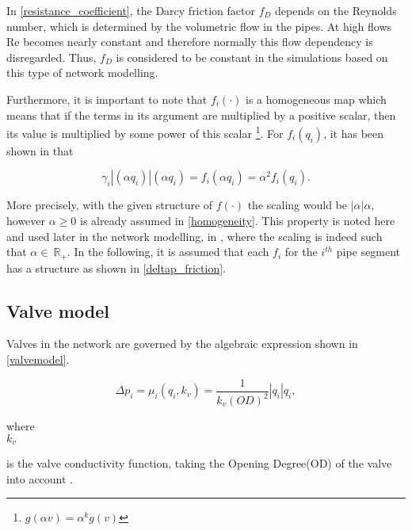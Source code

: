 In \eqref{resistance_coefficient}, the Darcy friction factor $f_D$ depends on the Reynolds number, which is determined by the volumetric flow in the pipes. At high flows Re becomes nearly constant and therefore normally this flow dependency is disregarded. Thus, $f_D$ is considered to be constant in the simulations based on this type of network modelling. 

Furthermore, it is important to note that $f_i(\cdot)$ is a homogeneous map which means that if the terms in its argument are multiplied by a positive scalar, then its value is multiplied by some power of this scalar \footnote{$g(\alpha v) = \alpha^k g(v)$}. For $f_i(q_i)$, it has been shown in \cite{oneinput_paper} that

\begin{equation}
  \label{homogeneity}
  \gamma_i |(\alpha q_i)|(\alpha q_i) = f_i(\alpha q_i) = \alpha^2 f_i(q_i).
\end{equation}

More precisely, with the given structure of $f(\cdot)$ the scaling would be $|\alpha|\alpha$, however $\alpha \geq 0$ is already assumed in \eqref{homogeneity}. 
This property is noted here and used later in the network modelling, in , where the scaling is indeed such that $\alpha \in \: \mathbb{R}_{+}$. In the following, it is assumed that each $f_i$ for the $i^{th}$ pipe segment has a structure as shown in \eqref{deltap_friction}.

\subsection{Valve model}
\label{valve_component}

Valves in the network are governed by the algebraic expression shown in \eqref{valvemodel}.

\begin{equation}
\label{valvemodel}
 \Delta p_i = \mu_i(q_i,k_v) = \frac{1}{k_v(OD)^2} |q_i| q_i, 
\end{equation}

 \begin{minipage}[t]{0.20\textwidth}
where\\
\hspace*{8mm} $k_v$ 
\end{minipage}
\begin{minipage}[t]{0.68\textwidth}
\vspace*{2mm}
is the valve conductivity function, taking the Opening Degree(OD) of the valve into account \cite{8thsemester_project}.
\end{minipage}

